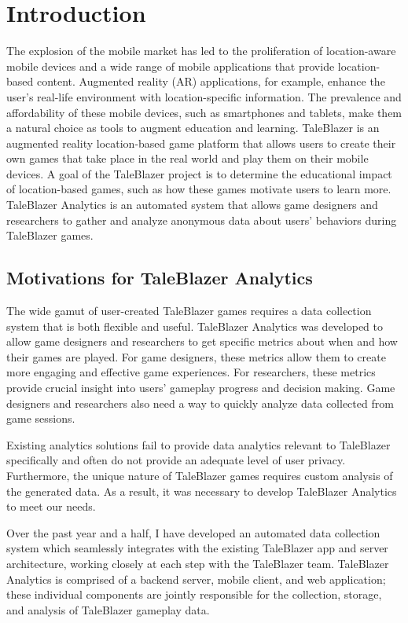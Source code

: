 \chapter{Introduction}

The explosion of the mobile market has led to the proliferation of location-aware mobile devices and a wide range of mobile applications that provide location-based content. Augmented reality (AR) applications, for example, enhance the user's real-life environment with location-specific information. The prevalence and affordability of these mobile devices, such as smartphones and tablets, make them a natural choice as tools to augment education and learning. TaleBlazer is an augmented reality location-based game platform that allows users to create their own games that take place in the real world and play them on their mobile devices. A goal of the TaleBlazer project is to determine the educational impact of location-based games, such as how these games motivate users to learn more. TaleBlazer Analytics is an automated system that allows game designers and researchers to gather and analyze anonymous data about users' behaviors during TaleBlazer games. 

\section{Motivations for TaleBlazer Analytics}
The wide gamut of user-created TaleBlazer games requires a data collection system that is both flexible and useful. TaleBlazer Analytics was developed to allow game designers and researchers to get specific metrics about when and how their games are played. For game designers, these metrics allow them to create more engaging and effective game experiences. For researchers, these metrics provide crucial insight into users' gameplay progress and decision making. Game designers and researchers also need a way to quickly analyze data collected from game sessions.

Existing analytics solutions fail to provide data analytics relevant to TaleBlazer specifically and often do not provide an adequate level of user privacy. Furthermore, the unique nature of TaleBlazer games requires custom analysis of the generated data. As a result, it was necessary to develop TaleBlazer Analytics to meet our needs. 

Over the past year and a half, I have developed an automated data collection system which seamlessly integrates with the existing TaleBlazer app and server architecture, working closely at each step with the TaleBlazer team. TaleBlazer Analytics is comprised of a backend server, mobile client, and web application; these individual components are jointly responsible for the collection, storage, and analysis of TaleBlazer gameplay data. 

